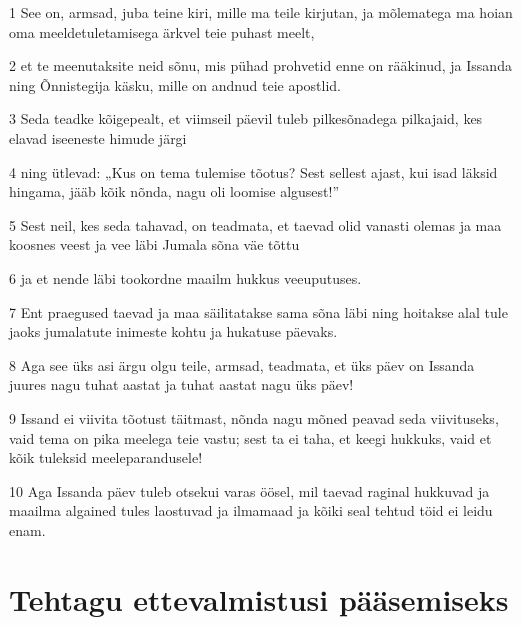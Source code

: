 \par 1 See on, armsad, juba teine kiri, mille ma teile kirjutan, ja mõlematega ma hoian oma meeldetuletamisega ärkvel teie puhast meelt,
\par 2 et te meenutaksite neid sõnu, mis pühad prohvetid enne on rääkinud, ja Issanda ning Õnnistegija käsku, mille on andnud teie apostlid.
\par 3 Seda teadke kõigepealt, et viimseil päevil tuleb pilkesõnadega pilkajaid, kes elavad iseeneste himude järgi
\par 4 ning ütlevad: „Kus on tema tulemise tõotus? Sest sellest ajast, kui isad läksid hingama, jääb kõik nõnda, nagu oli loomise algusest!”
\par 5 Sest neil, kes seda tahavad, on teadmata, et taevad olid vanasti olemas ja maa koosnes veest ja vee läbi Jumala sõna väe tõttu
\par 6 ja et nende läbi tookordne maailm hukkus veeuputuses.
\par 7 Ent praegused taevad ja maa säilitatakse sama sõna läbi ning hoitakse alal tule jaoks jumalatute inimeste kohtu ja hukatuse päevaks.
\par 8 Aga see üks asi ärgu olgu teile, armsad, teadmata, et üks päev on Issanda juures nagu tuhat aastat ja tuhat aastat nagu üks päev!
\par 9 Issand ei viivita tõotust täitmast, nõnda nagu mõned peavad seda viivituseks, vaid tema on pika meelega teie vastu; sest ta ei taha, et keegi hukkuks, vaid et kõik tuleksid meeleparandusele!
\par 10 Aga Issanda päev tuleb otsekui varas öösel, mil taevad raginal hukkuvad ja maailma algained tules laostuvad ja ilmamaad ja kõiki seal tehtud töid ei leidu enam.

\section*{Tehtagu ettevalmistusi pääsemiseks}

